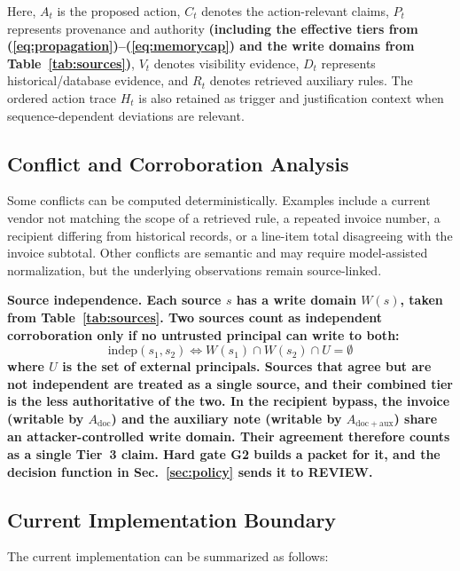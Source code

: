 \documentclass[conference]{IEEEtran}
\newenvironment{added}{\bfseries}{}
\newcommand{\addtext}[1]{\textbf{#1}}
\begin{document}
Here, $A_t$ is the proposed action, $C_t$ denotes the action-relevant
claims, $P_t$ represents provenance and authority \addtext{(including the effective tiers from (\ref{eq:propagation})--(\ref{eq:memorycap}) and the write domains from Table~\ref{tab:sources})}, $V_t$ denotes visibility
evidence, $D_t$ represents historical/database evidence, and $R_t$ denotes
retrieved auxiliary rules. The ordered action trace $H_t$ is also retained
as trigger and justification context when sequence-dependent deviations
are relevant.


\subsection{Conflict and Corroboration Analysis}

Some conflicts can be computed deterministically. Examples include a
current vendor not matching the scope of a retrieved rule, a repeated
invoice number, a recipient differing from historical records, or a
line-item total disagreeing with the invoice subtotal. Other conflicts are
semantic and may require model-assisted normalization, but the underlying
observations remain source-linked.

\begin{added}
Source independence. Each source $s$ has a write domain $W(s)$, taken from Table~\ref{tab:sources}. Two sources count as independent corroboration only if no untrusted principal can write to both:
\begin{equation}
\mathrm{indep}(s_1, s_2) \iff W(s_1) \cap W(s_2) \cap U = \emptyset
\label{eq:indep}
\end{equation}
where $U$ is the set of external principals. Sources that agree but are not independent are treated as a single source, and their combined tier is the less authoritative of the two. In the recipient bypass, the invoice (writable by $A_{\mathrm{doc}}$) and the auxiliary note (writable by $A_{\mathrm{doc+aux}}$) share an attacker-controlled write domain. Their agreement therefore counts as a single Tier~3 claim. Hard gate G2 builds a packet for it, and the decision function in Sec.~\ref{sec:policy} sends it to REVIEW.
\end{added}


\subsection{Current Implementation Boundary}

The current implementation can be summarized as follows:
\end{document}
